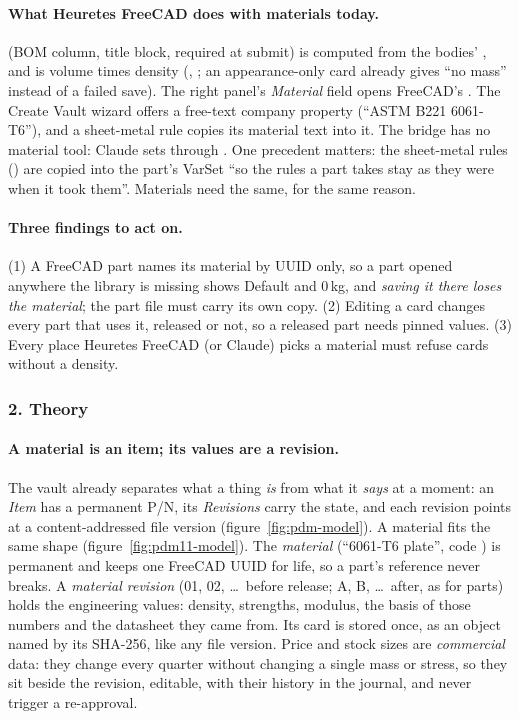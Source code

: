\paragraph{What Heuretes FreeCAD does with materials today.}  (BOM column, title block, required at submit)
is computed from the bodies' , and  is volume times density
(, ; an appearance-only card already gives ``no mass'' instead
of a failed save). The right panel's \emph{Material} field opens FreeCAD's . The Create Vault wizard
offers a free-text company property  (``ASTM B221 6061-T6''), and a sheet-metal rule copies its
material text into it. The bridge has no material tool: Claude sets  through . One
precedent matters: the sheet-metal rules () are copied into the part's VarSet ``so the rules a part takes
stay as they were when it took them''. Materials need the same, for the same reason.

\paragraph{Three findings to act on.} (1) A FreeCAD part names its material by UUID only, so a part opened anywhere
the library is missing shows Default and 0\,kg, and \emph{saving it there loses the material}; the part file must carry
its own copy. (2) Editing a card changes every part that uses it, released or not, so a released part needs pinned
values. (3) Every place Heuretes FreeCAD (or Claude) picks a material must refuse cards without a density.

\subsubsection*{2. Theory}

\paragraph{A material is an item; its values are a revision.} The vault already separates what a thing \emph{is} from
what it \emph{says} at a moment: an \emph{Item} has a permanent P/N, its \emph{Revisions} carry the state, and each
revision points at a content-addressed file version (figure~\ref{fig:pdm-model}). A material fits the same shape
(figure~\ref{fig:pdm11-model}). The \emph{material} (``6061-T6 plate'', code ) is permanent and keeps one
FreeCAD UUID for life, so a part's reference never breaks. A \emph{material revision} (01, 02, \ldots\ before release; A,
B, \ldots\ after, as for parts) holds the engineering values: density, strengths, modulus, the basis of those numbers and
the datasheet they came from. Its card is stored once, as an object named by its SHA-256, like any file version.
Price and stock sizes are \emph{commercial} data: they change every quarter without changing a single mass or stress, so
they sit beside the revision, editable, with their history in the journal, and never trigger a re-approval.

